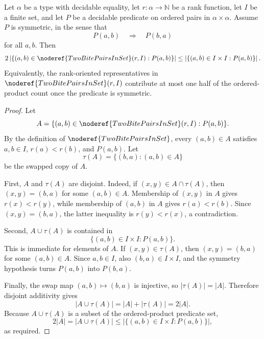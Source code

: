 \begin{helper}
Let \(\alpha\) be a type with decidable equality, let
\(r:\alpha\to\mathbb N\) be a rank function, let \(I\) be a finite set, and
let \(P\) be a decidable predicate on ordered pairs in \(\alpha\times\alpha\).
Assume \(P\) is symmetric, in the sense that
\[
P(a,b)\quad\Longrightarrow\quad P(b,a)
\]
for all \(a,b\).  Then
\[
2\left|
  \{(a,b)\in\noderef{TwoBitePairsInSet}(r,I):P(a,b)\}
\right|
\le
\left|\{(a,b)\in I\times I:P(a,b)\}\right|.
\]
Equivalently, the rank-oriented representatives in
\(\noderef{TwoBitePairsInSet}(r,I)\) contribute at most one half of the
ordered-product count once the predicate is symmetric.
\end{helper}
\begin{proof}
Let
\[
A=\{(a,b)\in\noderef{TwoBitePairsInSet}(r,I):P(a,b)\}.
\]
By the definition of \(\noderef{TwoBitePairsInSet}\), every \((a,b)\in A\)
satisfies \(a,b\in I\), \(r(a)<r(b)\), and \(P(a,b)\).  Let
\[
\tau(A)=\{(b,a):(a,b)\in A\}
\]
be the swapped copy of \(A\).

First, \(A\) and \(\tau(A)\) are disjoint.  Indeed, if
\((x,y)\in A\cap\tau(A)\), then \((x,y)=(b,a)\) for some
\((a,b)\in A\).  Membership of \((x,y)\) in \(A\) gives \(r(x)<r(y)\), while
membership of \((a,b)\) in \(A\) gives \(r(a)<r(b)\).  Since
\((x,y)=(b,a)\), the latter inequality is \(r(y)<r(x)\), a contradiction.

Second, \(A\cup\tau(A)\) is contained in
\[
\{(a,b)\in I\times I:P(a,b)\}.
\]
This is immediate for elements of \(A\).  If \((x,y)\in\tau(A)\), then
\((x,y)=(b,a)\) for some \((a,b)\in A\).  Since \(a,b\in I\), also
\((b,a)\in I\times I\), and the symmetry hypothesis turns \(P(a,b)\) into
\(P(b,a)\).

Finally, the swap map \((a,b)\mapsto(b,a)\) is injective, so
\(|\tau(A)|=|A|\).  Therefore disjoint additivity gives
\[
|A\cup\tau(A)|=|A|+|\tau(A)|=2|A|.
\]
Because \(A\cup\tau(A)\) is a subset of the ordered-product predicate set,
\[
2|A|=|A\cup\tau(A)|
\le \left|\{(a,b)\in I\times I:P(a,b)\}\right|,
\]
as required.
\end{proof}
